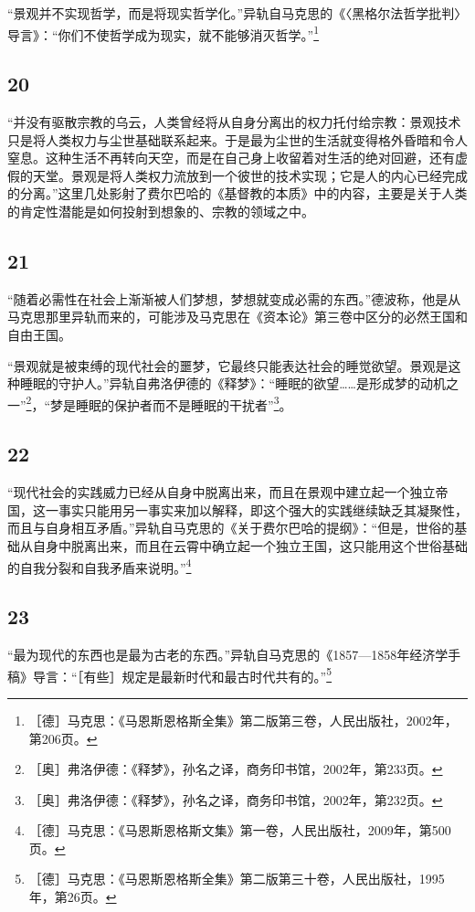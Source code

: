 \documentclass[fontset=fandol, a4paper, 12pt, openright]{ctexbook}
\begin{document}
“景观并不实现哲学，而是将现实哲学化。”异轨自马克思的《〈黑格尔法哲学批判〉导言》：“你们不使哲学成为现实，就不能够消灭哲学。”\footnote{［德］马克思：《马恩斯恩格斯全集》第二版第三卷，人民出版社，2002年，第206页。}

\subsection*{20}
“并没有驱散宗教的乌云，人类曾经将从自身分离出的权力托付给宗教：景观技术只是将人类权力与尘世基础联系起来。于是最为尘世的生活就变得格外昏暗和令人窒息。这种生活不再转向天空，而是在自己身上收留着对生活的绝对回避，还有虚假的天堂。景观是将人类权力流放到一个彼世的技术实现；它是人的内心已经完成的分离。”这里几处影射了费尔巴哈的《基督教的本质》中的内容，主要是关于人类的肯定性潜能是如何投射到想象的、宗教的领域之中。

\subsection*{21}
“随着必需性在社会上渐渐被人们梦想，梦想就变成必需的东西。”德波称，他是从马克思那里异轨而来的，可能涉及马克思在《资本论》第三卷中区分的必然王国和自由王国。

“景观就是被束缚的现代社会的噩梦，它最终只能表达社会的睡觉欲望。景观是这种睡眠的守护人。”异轨自弗洛伊德的《释梦》：“睡眠的欲望……是形成梦的动机之一”\footnote{［奥］弗洛伊德：《释梦》，孙名之译，商务印书馆，2002年，第233页。}，“梦是睡眠的保护者而不是睡眠的干扰者”\footnote{［奥］弗洛伊德：《释梦》，孙名之译，商务印书馆，2002年，第232页。}。

\subsection*{22}
“现代社会的实践威力已经从自身中脱离出来，而且在景观中建立起一个独立帝国，这一事实只能用另一事实来加以解释，即这个强大的实践继续缺乏其凝聚性，而且与自身相互矛盾。”异轨自马克思的《关于费尔巴哈的提纲》：“但是，世俗的基础从自身中脱离出来，而且在云霄中确立起一个独立王国，这只能用这个世俗基础的自我分裂和自我矛盾来说明。”\footnote{［德］马克思：《马恩斯恩格斯文集》第一卷，人民出版社，2009年，第500页。}

\subsection*{23}
“最为现代的东西也是最为古老的东西。”异轨自马克思的《1857—1858年经济学手稿》导言：“［有些］规定是最新时代和最古时代共有的。”\footnote{［德］马克思：《马恩斯恩格斯全集》第二版第三十卷，人民出版社，1995年，第26页。}
\end{document}
